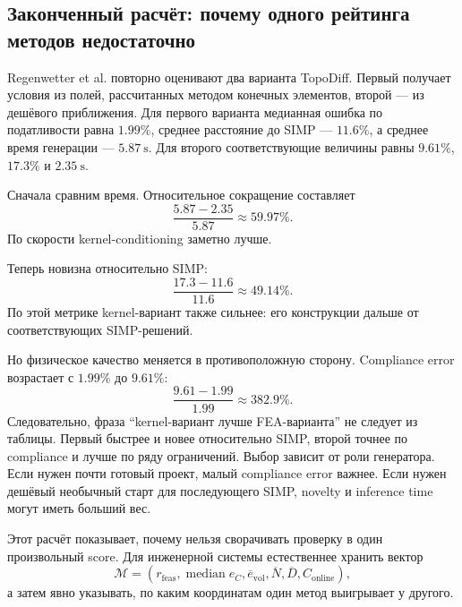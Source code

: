 \subsection{Законченный расчёт: почему одного рейтинга методов недостаточно}

Regenwetter et al. повторно оценивают два варианта TopoDiff. Первый получает условия из полей, рассчитанных методом конечных элементов, второй --- из дешёвого приближения. Для первого варианта медианная ошибка по податливости равна $1.99\%$, среднее расстояние до SIMP --- $11.6\%$, а среднее время генерации --- $5.87\ \mathrm{s}$. Для второго соответствующие величины равны $9.61\%$, $17.3\%$ и $2.35\ \mathrm{s}$.

Сначала сравним время. Относительное сокращение составляет
\begin{equation}
 \frac{5.87-2.35}{5.87}
 \approx
 \boxed{59.97\%}.
\end{equation}
По скорости kernel-conditioning заметно лучше.

Теперь новизна относительно SIMP:
\begin{equation}
 \frac{17.3-11.6}{11.6}
 \approx
 \boxed{49.14\%}.
\end{equation}
По этой метрике kernel-вариант также сильнее: его конструкции дальше от соответствующих SIMP-решений.

Но физическое качество меняется в противоположную сторону. Compliance error возрастает с $1.99\%$ до $9.61\%$:
\begin{equation}
 \frac{9.61-1.99}{1.99}
 \approx
 \boxed{382.9\%}.
\end{equation}
Следовательно, фраза ``kernel-вариант лучше FEA-варианта'' не следует из таблицы. Первый быстрее и новее относительно SIMP, второй точнее по compliance и лучше по ряду ограничений. Выбор зависит от роли генератора. Если нужен почти готовый проект, малый compliance error важнее. Если нужен дешёвый необычный старт для последующего SIMP, novelty и inference time могут иметь больший вес.

Этот расчёт показывает, почему нельзя сворачивать проверку в один произвольный score. Для инженерной системы естественнее хранить вектор
\begin{equation}
 \mathcal M
 =
 \left(
  r_{\mathrm{feas}},
  \operatorname{median} e_C,
  \overline e_{\mathrm{vol}},
  \overline N,
  \overline D,
  C_{\mathrm{online}}
 \right),
\end{equation}
а затем явно указывать, по каким координатам один метод выигрывает у другого.


